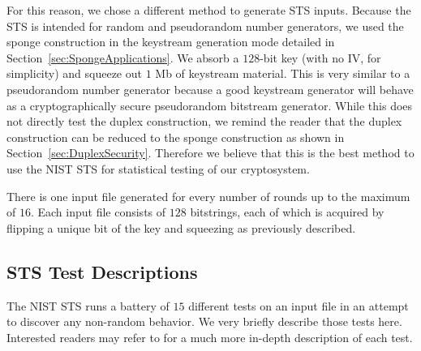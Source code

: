 For this reason, we chose a different method to generate STS inputs. 
Because the STS is intended for random and pseudorandom number generators, we used the sponge construction in the keystream generation mode detailed in Section~\ref{sec:SpongeApplications}. 
We absorb a $128$-bit key (with no IV, for simplicity) and squeeze out $1$ Mb of keystream material.
This is very similar to a pseudorandom number generator because a good keystream generator will behave as a cryptographically secure pseudorandom bitstream generator.
While this does not directly test the duplex construction, we remind the reader that the duplex construction can be reduced to the sponge construction as shown in Section~\ref{sec:DuplexSecurity}.
Therefore we believe that this is the best method to use the NIST STS for statistical testing of our cryptosystem.

There is one input file generated for every number of rounds up to the maximum of $16$.
Each input file consists of $128$ bitstrings, each of which is acquired by flipping a unique bit of the key and squeezing as previously described.

\subsection{STS Test Descriptions}
The NIST STS runs a battery of $15$ different tests on an input file in an attempt to discover any non-random behavior.
We very briefly describe those tests here. 
Interested readers may refer to \cite{NIST2010_STS} for a much more in-depth description of each test.

